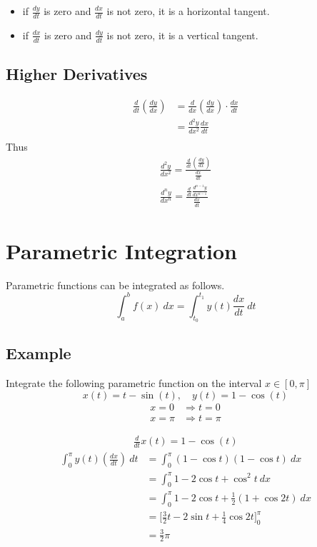 \documentclass{article}
\theoremstyle{mytheoremstyle}
\theoremstyle{mytheoremstyle}
\theoremstyle{myproblemstyle}
\begin{document}
    \begin{itemize}
        \item if $\frac{dy}{dt}$ is zero and $\frac{dx}{dt}$ is not zero, it is
            a horizontal tangent.
        \item if $\frac{dx}{dt}$ is zero and $\frac{dy}{dt}$ is not zero, it is
            a vertical tangent.
    \end{itemize}

    \subsection*{Higher Derivatives}
    \begin{align*}
        \frac{d}{dt}(\frac{dy}{dx}) &= \frac{d}{dx}(\frac{dy}{dx}) \cdot\frac{dx}{dt} \\
        &= \frac{d^2y}{dx^2} \frac{dx}{dt} \\
    \end{align*}
    Thus
    \begin{align*}
        \frac{d^2y}{dx^2} = \frac{\frac{d}{dt} (\frac{dy}{dx})}{\frac{dx}{dt}} \\
        \frac{d^ny}{dx^n} = \frac{\frac{d}{dt} \frac{d^{n-1} y}{dx^{n-1}}}{\frac{dx}{dt}}
    \end{align*}

    \section*{Parametric Integration}
    Parametric functions can be integrated as follows.
    \[
        \int_{a}^{b} f(x) \ dx = \int_{t_0}^{t_1} y(t) \frac{dx}{dt} \ dt
    \]

    \subsection*{Example}
    Integrate the following parametric function on the interval $x\in[0,\pi]$
    \[
        x(t) = t-\sin(t),\quad y(t)=1-\cos(t)
    \]
    \begin{align*}
        x=0 &\Rightarrow t=0 \\
        x=\pi &\Rightarrow t=\pi
    \end{align*}

    \begin{align*}
        \frac{d}{dt} x(t) = 1-\cos (t)
    \end{align*}
    \begin{align*}
        \int_{0}^{\pi} y(t)(\frac{dx}{dt}) \ dt
        &= \int_{0}^{\pi} (1-\cos t)(1-\cos t) \ dx \\
        &= \int_{0}^{\pi} 1 - 2\cos t + \cos^2 t \ dx \\
        &= \int_{0}^{\pi} 1 - 2\cos t + \frac{1}{2} (1 + \cos 2t) \ dx \\
        &= \Big[\frac{3}{2} t - 2\sin t +\frac{1}{4} \cos 2t\Big]_0^\pi \\
        &= \frac{3}{2} \pi
    \end{align*}
\end{document}
